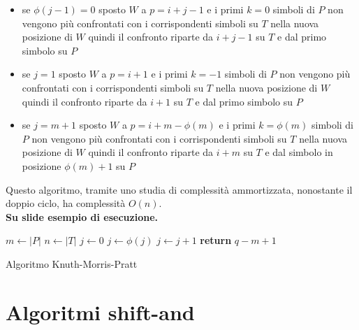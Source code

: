 \begin{itemize}
  \item se $\phi(j-1)=0$ sposto $W$ a $p=i+j-1$ e i primi $k=0$ simboli di $P$
  non vengono più confrontati con i corrispondenti simboli su $T$ nella nuova
  posizione di $W$ quindi il confronto riparte da $i+j-1$ su $T$ e dal primo
  simbolo su $P$
  \item se $j=1$ sposto $W$ a $p=i+1$ e i primi $k=-1$ simboli di $P$
  non vengono più confrontati con i corrispondenti simboli su $T$ nella nuova
  posizione di $W$ quindi il confronto riparte da $i+1$ su $T$ e dal primo
  simbolo su $P$
  \item se $j=m+1$ sposto $W$ a $p=i+m-\phi(m)$ e i primi $k=\phi(m)$ simboli di
  $P$ 
  non vengono più confrontati con i corrispondenti simboli su $T$ nella nuova
  posizione di $W$ quindi il confronto riparte da $i+m$ su $T$ e dal 
  simbolo in posizione $\phi(m)+1$ su $P$
\end{itemize}

Questo algoritmo, tramite uno studia di complessità ammortizzata, nonostante il
doppio ciclo, ha complessità $O(n)$.\\
\textbf{Su slide esempio di esecuzione.}
\begin{algorithm}
  \begin{algorithmic}
    \State $m\gets |P|$
    \State $n\gets |T|$
    \State $j\gets 0$
    \State $j \gets \phi(j)$
    \EndWhile
    \State $j\gets j+1$
    \State \textbf{return} $q-m+1$
    \EndIf
    \EndFor   
    \EndFunction
  \end{algorithmic}
  \caption{Algoritmo Knuth-Morris-Pratt}
\end{algorithm}
\section{Algoritmi shift-and}
